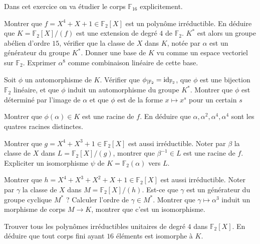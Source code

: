 \documentclass[french]{report}
\begin{document}
\begin{exo}
    Dans cet exercice on va étudier le corps \(\mathbb{F}_{16}\) explicitement.
    \begin{q}{1}
        Montrer que \(f=X^4+X+1\in\mathbb{F}_2[X]\) est un polynôme irréductible.
        En déduire que \(K=\mathbb{F}_2[X]/(f)\) est une extension de degré \(4\) de
        \(\mathbb{F}_2\). \(K^*\) est alors un groupe abélien d'ordre \(15\), vérifier
        que la classe de \(X\) dans \(K\), notée par \(\alpha\) est un générateur
        du groupe \(K^*\). Donner une base de \(K\) vu comme un espace vectoriel
        sur \(\mathbb{F}_2\). Exprimer \(\alpha^8\) comme combinaison linéaire de
        cette base.
    \end{q}
    \begin{q}{2}
        Soit \(\phi\) un automorphisme de \(K\). Vérifier que \(\phi_{\mid\mathbb{F}_2}
        =\mathrm{id}_{\mathbb{F}_2}\), que \(\phi\) est une bijection \(\mathbb{F}_2\) linéaire, et
        que \(\phi\) induit un automorphisme du groupe \(K^*\). Montrer que \(\phi\) est
        déterminé par l'image de \(\alpha\) et que \(\phi\) est de la forme \(x\mapsto x^s\)
        pour un certain \(s\)
    \end{q}
    \begin{q}{3}
        Montrer que \(\phi(\alpha)\in K\) est une racine de \(f\). En déduire que
        \(\alpha,\alpha^2,\alpha^4,\alpha^4\) sont les quatres racines distinctes.
    \end{q}
    \begin{q}{4}
        Montrer que \(g=X^4+X^3+1\in\mathbb{F}_2[X]\) est aussi irréductible. Noter
        par \(\beta\) la classe de \(X\) dans \(L=\mathbb{F}_2[X]/(g)\), montrer que
        \(\beta^{-1}\in L\) est une racine de \(f\). Expliciter un isomorphisme
        \(\psi\) de \(K=\mathbb{F}_2(\alpha)\) vers \(L\).
    \end{q}
    \begin{q}{5}
        Montrer que \(h=X^4+X^3+X^2+X+1\in\mathbb{F}_2[X]\) est aussi irréductible.
        Noter par \(\gamma\) la classe de \(X\) dans \(M=\mathbb{F}_2[X]/(h)\).
        Est-ce que \(\gamma\) est un générateur du groupe cyclique \(M^*\) ? Calculer
        l'ordre de \(\gamma\in M^*\). Montrer que \(\gamma\mapsto \alpha^3\) induit
        un morphisme de corps \(M\to K\), montrer que c'est un isomorphisme.
    \end{q}
    \begin{q}{6}
        Trouver tous les polynômes irréductibles unitaires de degré \(4\) dans
        \(\mathbb{F}_2[X]\). En déduire que tout corps fini ayant \(16\) éléments est
        isomorphe à \(K\).
    \end{q}
\end{exo}
\end{document}
